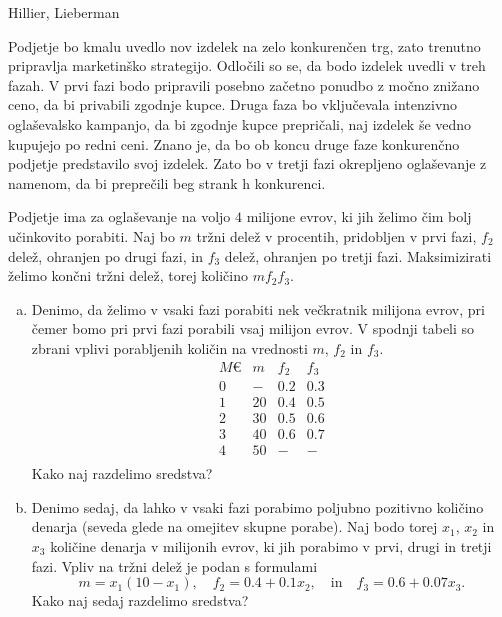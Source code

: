 \begin{naloga}{Hillier, Lieberman}{\cite[Problem~11.3-8]{hl}}
\begin{vprasanje}
Podjetje bo kmalu uvedlo nov izdelek na zelo konkurenčen trg,
zato trenutno pripravlja marketinško strategijo.
Odločili so se, da bodo izdelek uvedli v treh fazah.
V prvi fazi bodo pripravili posebno začetno ponudbo z močno znižano ceno,
da bi privabili zgodnje kupce.
Druga faza bo vključevala intenzivno oglaševalsko kampanjo,
da bi zgodnje kupce prepričali, naj izdelek še vedno kupujejo po redni ceni.
Znano je, da bo ob koncu druge faze
konkurenčno podjetje predstavilo svoj izdelek.
Zato bo v tretji fazi okrepljeno oglaševanje z namenom,
da bi preprečili beg strank h konkurenci.

Podjetje ima za oglaševanje na voljo $4$ milijone evrov,
ki jih želimo čim bolj učinkovito porabiti.
Naj bo $m$ tržni delež v procentih, pridobljen v prvi fazi,
$f_2$ delež, ohranjen po drugi fazi,
in $f_3$ delež, ohranjen po tretji fazi.
Maksimizirati želimo končni tržni delež, torej količino $m f_2 f_3$.

\begin{enumerate}[(a)]
\item Denimo, da želimo v vsaki fazi porabiti nek večkratnik milijona evrov,
pri čemer bomo pri prvi fazi porabili vsaj milijon evrov.
V spodnji tabeli so zbrani vplivi porabljenih količin
na vrednosti $m$, $f_2$ in $f_3$.
$$
\begin{array}{c|ccc}
M€ & m & f_2 & f_3 \\
\hline
0 &  - & 0.2 & 0.3 \\
1 & 20 & 0.4 & 0.5 \\
2 & 30 & 0.5 & 0.6 \\
3 & 40 & 0.6 & 0.7 \\
4 & 50 &   - &   - \\
\end{array}
$$
Kako naj razdelimo sredstva?
\item Denimo sedaj,
da lahko v vsaki fazi porabimo poljubno pozitivno količino denarja
(seveda glede na omejitev skupne porabe).
Naj bodo torej $x_1$, $x_2$ in $x_3$ količine denarja v milijonih evrov,
ki jih porabimo v prvi, drugi in tretji fazi.
Vpliv na tržni delež je podan s formulami
$$
m = x_1 (10 - x_1), \quad
f_2 = 0.4 + 0.1 x_2, \quad \text{in} \quad
f_3 = 0.6 + 0.07 x_3 .
$$
Kako naj sedaj razdelimo sredstva?
\end{enumerate}
\end{vprasanje}


\end{naloga}
